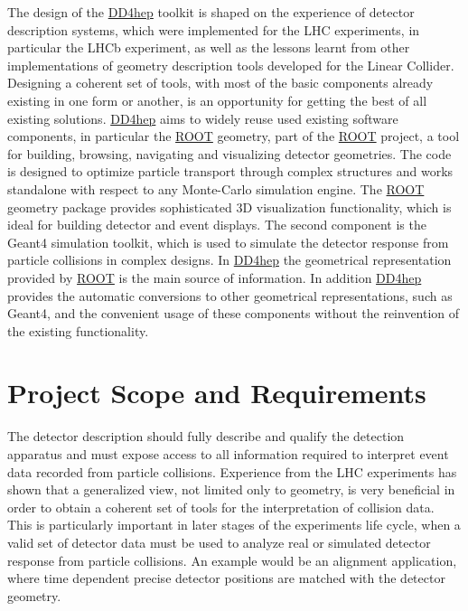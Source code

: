 The design of the \hyperlink{namespace_d_d4hep}{D\+D4hep} toolkit is shaped on the experience of detector description systems, which were implemented for the L\+HC experiments, in particular the L\+H\+Cb experiment, as well as the lessons learnt from other implementations of geometry description tools developed for the Linear Collider. Designing a coherent set of tools, with most of the basic components already existing in one form or another, is an opportunity for getting the best of all existing solutions. \hyperlink{namespace_d_d4hep}{D\+D4hep} aims to widely reuse used existing software components, in particular the \hyperlink{namespace_r_o_o_t}{R\+O\+OT} geometry, part of the \hyperlink{namespace_r_o_o_t}{R\+O\+OT} project, a tool for building, browsing, navigating and visualizing detector geometries. The code is designed to optimize particle transport through complex structures and works standalone with respect to any Monte-\/\+Carlo simulation engine. The \hyperlink{namespace_r_o_o_t}{R\+O\+OT} geometry package provides sophisticated 3D visualization functionality, which is ideal for building detector and event displays. The second component is the Geant4 simulation toolkit, which is used to simulate the detector response from particle collisions in complex designs. In \hyperlink{namespace_d_d4hep}{D\+D4hep} the geometrical representation provided by \hyperlink{namespace_r_o_o_t}{R\+O\+OT} is the main source of information. In addition \hyperlink{namespace_d_d4hep}{D\+D4hep} provides the automatic conversions to other geometrical representations, such as Geant4, and the convenient usage of these components without the reinvention of the existing functionality.\hypertarget{index_SCOPE}{}\section{Project Scope and Requirements}\label{index_SCOPE}
The detector description should fully describe and qualify the detection apparatus and must expose access to all information required to interpret event data recorded from particle collisions. Experience from the L\+HC experiments has shown that a generalized view, not limited only to geometry, is very beneficial in order to obtain a coherent set of tools for the interpretation of collision data. This is particularly important in later stages of the experiment\textquotesingle{}s life cycle, when a valid set of detector data must be used to analyze real or simulated detector response from particle collisions. An example would be an alignment application, where time dependent precise detector positions are matched with the detector geometry.

